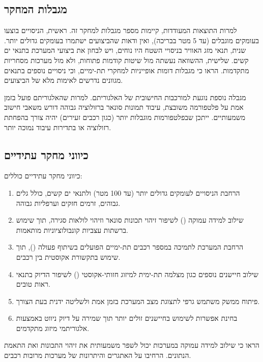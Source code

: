 \subsection{מגבלות המחקר}
\label{sec:limitations}

למרות התוצאות המעודדות, קיימות מספר מגבלות למחקר זה. ראשית, הניסויים בוצעו בעומקים מוגבלים (עד 5 מטר בבריכה), ואין ודאות שהביצועים ישתמרו בעומקים גדולים יותר. שנית, תנאי מזג האוויר בניסויי השטח היו נוחים, ויש לבחון את ביצועי המערכת בתנאי ים קשים. שלישית, ההשוואה נעשתה מול שיטות קודמות פתוחות, ולא מול מערכות מסחריות מתקדמות. \citet{Kaess2012} הראו כי מגבלות דומות אופייניות למחקרי  תת-ימיים, וכי ניסויים נוספים בתנאים מגוונים נדרשים לאימות מלא של הביצועים.

מגבלה נוספת נוגעת למורכבות החישובית של האלגוריתם. למרות שהאלגוריתם פועל בזמן אמת על פלטפורמה משובצת, עיבוד תמונות סונאר ברזולוציה גבוהה דורש משאבי חישוב משמעותיים. ייתכן שבפלטפורמות מוגבלות יותר (כגון רכבים זעירים) יהיה צורך בהפחתת רזולוציה או בתדירות עיבוד נמוכה יותר.

\subsection{כיווני מחקר עתידיים}
\label{sec:future_work}

כיווני מחקר עתידיים כוללים:

\begin{enumerate}
    \item הרחבת הניסויים לעומקים גדולים יותר (עד 100 מטר) ולתנאי ים קשים, כולל גלים גבוהים, זרמים חזקים וערפליות גבוהה.
    \item שילוב למידה עמוקה () לשיפור זיהוי תכונות סונאר וזיהוי לולאות סגירה, תוך שימוש ברשתות עצביות קונבולוציוניות מותאמות.
    \item הרחבת המערכת לתמיכה במספר רכבים תת-ימיים הפועלים בשיתוף פעולה (), תוך שימוש בתקשורת אקוסטית בין רכבים.
    \item שילוב חיישנים נוספים כגון מצלמה תת-ימית למיזוג חזותי-אקוסטי () לשיפור הדיוק בתנאי ראות טובים.
    \item פיתוח ממשק משתמש גרפי לתצוגת מצב המערכת בזמן אמת ולשליטה ידנית בעת הצורך.
    \item בחינת אפשרות לשימוש בחיישנים זולים יותר תוך שמירה על דיוק ניווט באמצעות אלגוריתמי מיזוג מתקדמים.
\end{enumerate}

\citet{MurArtal2015ORB} הראו כי שילוב למידה עמוקה במערכות  יכול לשפר משמעותית את זיהוי התכונות ואת התאמת הנתונים. \citet{Kaess2012} הרחיבו על האתגרים והיתרונות של מערכות  מרובות רכבים.

